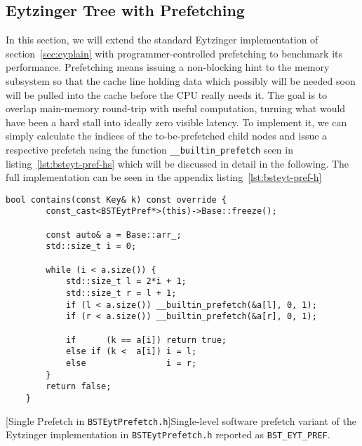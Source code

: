 \documentclass{article}
\begin{document}
\subsection{Eytzinger Tree with Prefetching}
\label{sec:prefey}
In this section, we will extend the standard Eytzinger implementation of section~\ref{sec:eyplain} with programmer-controlled prefetching to benchmark its performance. Prefetching means issuing a non-blocking hint to the memory subsystem so that the cache line holding data which possibly will be needed soon will be pulled into the cache before the CPU really needs it. The goal is to overlap main-memory round-trip with useful computation, turning what would have been a hard stall into ideally zero visible latency. To implement it, we can simply calculate the indices of the to-be-prefetched child nodes and issue a respective prefetch using the function \texttt{\_\_builtin\_prefetch} seen in listing~\ref{lst:bsteyt-pref-hs} which will be discussed in detail in the following. The full implementation can be seen in the appendix listing~\ref{lst:bsteyt-pref-h}

\begin{lstlisting}
bool contains(const Key& k) const override {
        const_cast<BSTEytPref*>(this)->Base::freeze();

        const auto& a = Base::arr_;   
        std::size_t i = 0;

        while (i < a.size()) {
            std::size_t l = 2*i + 1;
            std::size_t r = l + 1;
            if (l < a.size()) __builtin_prefetch(&a[l], 0, 1);
            if (r < a.size()) __builtin_prefetch(&a[r], 0, 1);

            if      (k == a[i]) return true;
            else if (k <  a[i]) i = l;
            else                i = r;
        }
        return false;
    }
\end{lstlisting}
[Single Prefetch in \texttt{BSTEytPrefetch.h}]{Single-level software
prefetch variant of the Eytzinger implementation in \texttt{BSTEytPrefetch.h} reported as \texttt{BST\_EYT\_PREF}.}
\label{lst:bsteyt-pref-hs}
\end{document}
